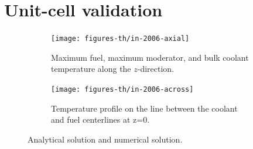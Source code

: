 \documentclass[11pt,letterpaper]{article}
\begin{document}
\section{Unit-cell validation}





	\begin{figure}[htbp!]
		\centering
		\begin{subfigure}[t]{0.4\textwidth}
			\centering
			\texttt{[image: figures-th/in-2006-axial]}
			\caption{Maximum fuel, maximum moderator, and bulk coolant temperature along the $z$-direction.}
		\end{subfigure}
		\begin{subfigure}[t]{0.4\textwidth}
			\centering
			\texttt{[image: figures-th/in-2006-across]}
			\caption{Temperature profile on the line between the coolant and fuel centerlines at z=0.}
		\end{subfigure}
		\hfill
		\caption{Analytical solution and numerical solution.}
		\label{fig:verification}
	\end{figure}


\pagebreak


\end{document}
